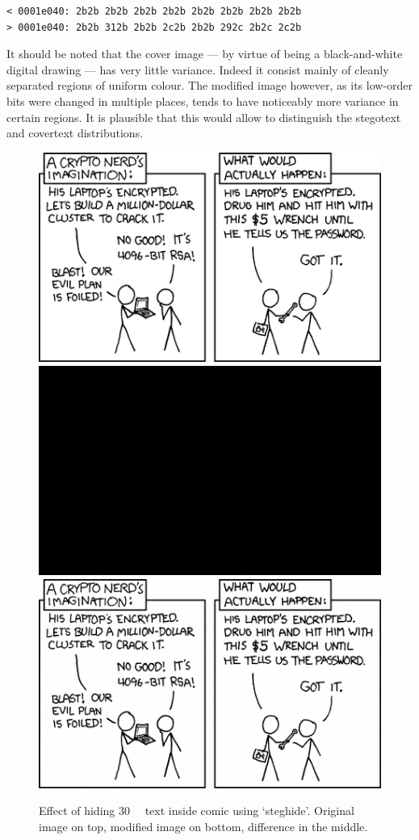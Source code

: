 \documentclass[a4paper]{scrreprt}
\begin{document}
\begin{lstlisting}
< 0001e040: 2b2b 2b2b 2b2b 2b2b 2b2b 2b2b 2b2b 2b2b
> 0001e040: 2b2b 312b 2b2b 2c2b 2b2b 292c 2b2c 2c2b
\end{lstlisting}

It should be noted that the cover image --- by virtue of being a
black-and-white digital drawing --- has very little variance. Indeed it consist
mainly of cleanly separated regions of uniform colour. The modified image
however, as its low-order bits were changed in multiple places, tends to have
noticeably more variance in certain regions. It is plausible that this would
allow to distinguish the stegotext and covertext distributions.

\begin{figure}
		\centering
		\includegraphics[width=0.7\linewidth]{resources/coverfile} \\
		\includegraphics[width=0.7\linewidth]{resources/difference} \\
		\includegraphics[width=0.7\linewidth]{resources/stegofile_30k}
		\caption{
				Effect of hiding \SI{30}{\kilo\byte} text inside comic using
				`steghide'. Original image on top, modified image on bottom, difference
				in the middle.
		}
		\label{fig:steganography}
\end{figure}

\printbibliography
\end{document}
